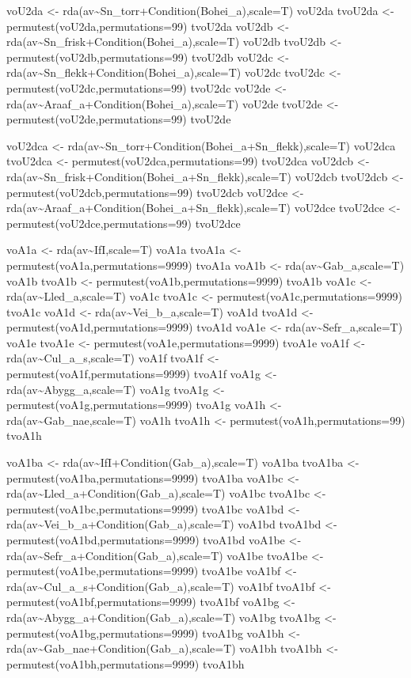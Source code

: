 \documentclass[]{article}
\begin{document}
voU2da \textless{}-
rda(av\textasciitilde{}Sn\_torr+Condition(Bohei\_a),scale=T) voU2da
tvoU2da \textless{}- permutest(voU2da,permutations=99) tvoU2da voU2db
\textless{}-
rda(av\textasciitilde{}Sn\_frisk+Condition(Bohei\_a),scale=T) voU2db
tvoU2db \textless{}- permutest(voU2db,permutations=99) tvoU2db voU2dc
\textless{}-
rda(av\textasciitilde{}Sn\_flekk+Condition(Bohei\_a),scale=T) voU2dc
tvoU2dc \textless{}- permutest(voU2dc,permutations=99) tvoU2dc voU2de
\textless{}-
rda(av\textasciitilde{}Araaf\_a+Condition(Bohei\_a),scale=T) voU2de
tvoU2de \textless{}- permutest(voU2de,permutations=99) tvoU2de

voU2dca \textless{}-
rda(av\textasciitilde{}Sn\_torr+Condition(Bohei\_a+Sn\_flekk),scale=T)
voU2dca tvoU2dca \textless{}- permutest(voU2dca,permutations=99)
tvoU2dca voU2dcb \textless{}-
rda(av\textasciitilde{}Sn\_frisk+Condition(Bohei\_a+Sn\_flekk),scale=T)
voU2dcb tvoU2dcb \textless{}- permutest(voU2dcb,permutations=99)
tvoU2dcb voU2dce \textless{}-
rda(av\textasciitilde{}Araaf\_a+Condition(Bohei\_a+Sn\_flekk),scale=T)
voU2dce tvoU2dce \textless{}- permutest(voU2dce,permutations=99)
tvoU2dce

voA1a \textless{}- rda(av\textasciitilde{}IfI,scale=T) voA1a tvoA1a
\textless{}- permutest(voA1a,permutations=9999) tvoA1a voA1b
\textless{}- rda(av\textasciitilde{}Gab\_a,scale=T) voA1b tvoA1b
\textless{}- permutest(voA1b,permutations=9999) tvoA1b voA1c
\textless{}- rda(av\textasciitilde{}Lled\_a,scale=T) voA1c tvoA1c
\textless{}- permutest(voA1c,permutations=9999) tvoA1c voA1d
\textless{}- rda(av\textasciitilde{}Vei\_b\_a,scale=T) voA1d tvoA1d
\textless{}- permutest(voA1d,permutations=9999) tvoA1d voA1e
\textless{}- rda(av\textasciitilde{}Sefr\_a,scale=T) voA1e tvoA1e
\textless{}- permutest(voA1e,permutations=9999) tvoA1e voA1f
\textless{}- rda(av\textasciitilde{}Cul\_a\_s,scale=T) voA1f tvoA1f
\textless{}- permutest(voA1f,permutations=9999) tvoA1f voA1g
\textless{}- rda(av\textasciitilde{}Abygg\_a,scale=T) voA1g tvoA1g
\textless{}- permutest(voA1g,permutations=9999) tvoA1g voA1h
\textless{}- rda(av\textasciitilde{}Gab\_nae,scale=T) voA1h tvoA1h
\textless{}- permutest(voA1h,permutations=99) tvoA1h

voA1ba \textless{}-
rda(av\textasciitilde{}IfI+Condition(Gab\_a),scale=T) voA1ba tvoA1ba
\textless{}- permutest(voA1ba,permutations=9999) tvoA1ba voA1bc
\textless{}- rda(av\textasciitilde{}Lled\_a+Condition(Gab\_a),scale=T)
voA1bc tvoA1bc \textless{}- permutest(voA1bc,permutations=9999) tvoA1bc
voA1bd \textless{}-
rda(av\textasciitilde{}Vei\_b\_a+Condition(Gab\_a),scale=T) voA1bd
tvoA1bd \textless{}- permutest(voA1bd,permutations=9999) tvoA1bd voA1be
\textless{}- rda(av\textasciitilde{}Sefr\_a+Condition(Gab\_a),scale=T)
voA1be tvoA1be \textless{}- permutest(voA1be,permutations=9999) tvoA1be
voA1bf \textless{}-
rda(av\textasciitilde{}Cul\_a\_s+Condition(Gab\_a),scale=T) voA1bf
tvoA1bf \textless{}- permutest(voA1bf,permutations=9999) tvoA1bf voA1bg
\textless{}- rda(av\textasciitilde{}Abygg\_a+Condition(Gab\_a),scale=T)
voA1bg tvoA1bg \textless{}- permutest(voA1bg,permutations=9999) tvoA1bg
voA1bh \textless{}-
rda(av\textasciitilde{}Gab\_nae+Condition(Gab\_a),scale=T) voA1bh
tvoA1bh \textless{}- permutest(voA1bh,permutations=9999) tvoA1bh
\end{document}
